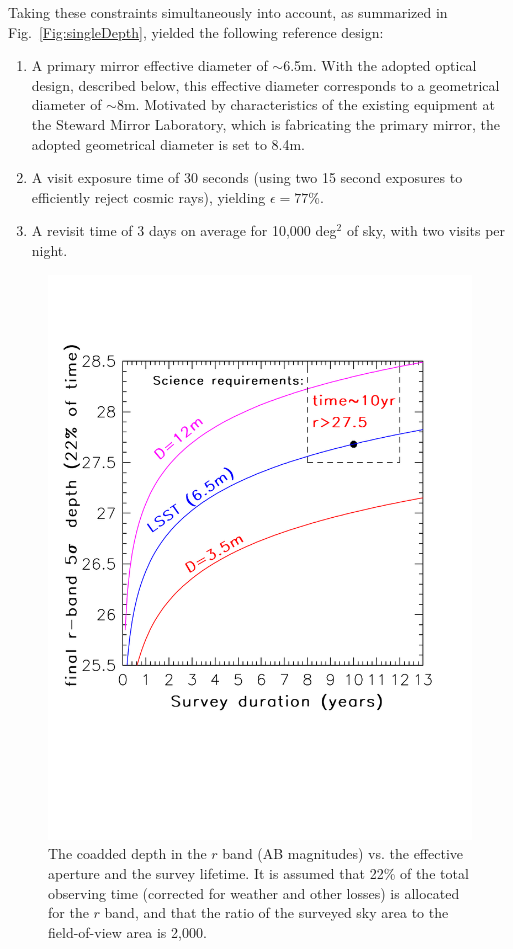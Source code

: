 \documentclass{emulateapj}
\begin{document}
Taking these constraints simultaneously into account, as summarized in 
Fig.~\ref{Fig:singleDepth}, 
yielded the following reference design:
\begin{enumerate}
\item A primary mirror effective diameter of $\sim$6.5m. With the adopted optical 
design, described below, this effective diameter corresponds to a geometrical diameter 
of $\sim$8m. Motivated by characteristics of the existing equipment at the
Steward Mirror Laboratory, which is fabricating the primary mirror, the adopted
geometrical diameter is set to 8.4m. 
\item A visit exposure time of 30 seconds (using two 15 second exposures
to efficiently reject cosmic rays), yielding $\epsilon=77$\%.
\item A revisit time of 3 days on average for 10,000 deg$^2$ of sky, 
  with two visits per night.
\end{enumerate}

\begin{figure}[t]
\vskip -0.5in
\includegraphics[width=1.1\hsize,clip]{coaddedDepth.pdf}
\vskip -1.1in
\caption{The coadded depth in the $r$ band (AB magnitudes) vs. the effective aperture and 
the survey lifetime. It is assumed that 22\% of the total observing time (corrected for
weather and other losses) is allocated for the $r$ band, and that the ratio of 
the surveyed sky area to the field-of-view area is 2,000.} 
\label{Fig:coaddDepth}
\end{figure}
\end{document}
